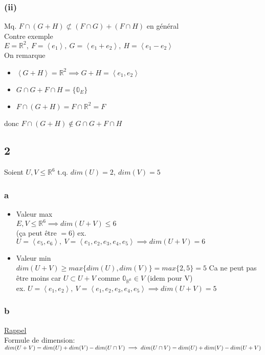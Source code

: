 \documentclass[11pt]{exam}
\newcommand{\R}{\mathbb{R}}
\newcommand{\0}{\mathbb{0}}
\begin{document}
\subsubsection*{(ii)}
Mq. $F\cap(G+H) \not\subset (F\cap G) + (F\cap H)$ en général\\
Contre exemple\\
$E = \R^2,\ F = \left<e_1\right>,\ G = \left<e_1+e_2\right>,\ H = \left<e_1-e_2\right>$\\
On remarque 
\begin{itemize}
    \item $\left<G+H\right> = \R^2 \implies G+H = \left<e_1,e_2\right>$
    \item $G\cap G + F\cap H = \{\mathbb{0}_E\}$
    \item $F\cap(G+H) = F\cap\R^2 = F$
\end{itemize}
donc $F\cap(G+H) \not\in G\cap G + F\cap H$
\subsection*{2}
Soient $U,V \leq \R^6$ t.q. $dim(U)=2,\ dim(V)=5$
\subsubsection*{a}
\begin{itemize}
    \item Valeur max\\
    $E,V \leq \R^6 \implies dim(U+V) \leq 6$\\
    (ça peut être $=6$) ex. $U = \left<e_5,e_6\right>,\ V = \left<e_1,e_2,e_3,e_4,e_5\right> \implies dim(U+V) = 6$
    \item Valeur min\\
    $dim(U+V) \geq max\{dim(U), dim(V)\} = max\{2,5\} = 5$ Ca ne peut pas être moins car $U \subset U+V$ comme $\mathbb{0}_{\R^6} \in V$ (idem pour V)\\
    ex. $U = \left<e_1,e_2\right>,\ V = \left<e_1,e_2,e_3,e_4,e_5\right> \implies dim(U+V) = 5$
\end{itemize}
\subsubsection*{b}
\underline{Rappel}\\
Formule de dimension: $dim(U+V) = dim(U) + dim(V) - dim(U\cap V)\\\implies dim(U\cap V) = dim(U) + dim(V) - dim(U+V)$\\\hbox{}
\end{document}
